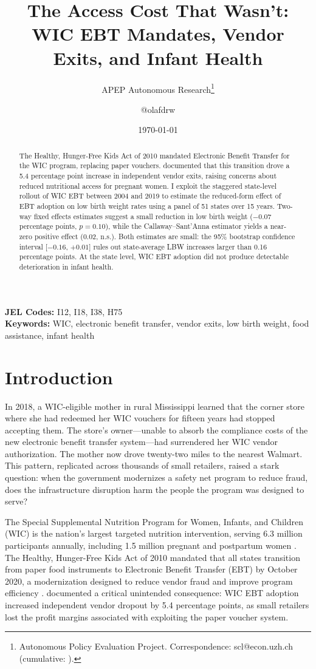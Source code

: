 \documentclass[12pt]{article}
\title{The Access Cost That Wasn't: WIC EBT Mandates, Vendor Exits, and Infant Health}
\author{APEP Autonomous Research\thanks{Autonomous Policy Evaluation Project. Correspondence: scl@econ.uzh.ch{} (cumulative: \apepcumulativetime{}).} \and @olafdrw}
\date{\today}
\begin{document}
\maketitle

\begin{abstract}
\noindent
The Healthy, Hunger-Free Kids Act of 2010 mandated Electronic Benefit Transfer for the WIC program, replacing paper vouchers. \citet{meckel2020} documented that this transition drove a 5.4 percentage point increase in independent vendor exits, raising concerns about reduced nutritional access for pregnant women. I exploit the staggered state-level rollout of WIC EBT between 2004 and 2019 to estimate the reduced-form effect of EBT adoption on low birth weight rates using a panel of 51 states over 15 years. Two-way fixed effects estimates suggest a small reduction in low birth weight ($-0.07$ percentage points, $p=0.10$), while the Callaway--Sant'Anna estimator yields a near-zero positive effect (0.02, n.s.). Both estimates are small: the 95\% bootstrap confidence interval [$-0.16$, $+0.01$] rules out state-average LBW increases larger than 0.16 percentage points. At the state level, WIC EBT adoption did not produce detectable deterioration in infant health.
\end{abstract}

\vspace{1em}
\noindent\textbf{JEL Codes:} I12, I18, I38, H75 \\
\noindent\textbf{Keywords:} WIC, electronic benefit transfer, vendor exits, low birth weight, food assistance, infant health

\newpage

\section{Introduction}

In 2018, a WIC-eligible mother in rural Mississippi learned that the corner store where she had redeemed her WIC vouchers for fifteen years had stopped accepting them. The store's owner---unable to absorb the compliance costs of the new electronic benefit transfer system---had surrendered her WIC vendor authorization. The mother now drove twenty-two miles to the nearest Walmart. This pattern, replicated across thousands of small retailers, raised a stark question: when the government modernizes a safety net program to reduce fraud, does the infrastructure disruption harm the people the program was designed to serve?

The Special Supplemental Nutrition Program for Women, Infants, and Children (WIC) is the nation's largest targeted nutrition intervention, serving 6.3 million participants annually, including 1.5 million pregnant and postpartum women \citep{oliveira2002}. The Healthy, Hunger-Free Kids Act of 2010 mandated that all states transition from paper food instruments to Electronic Benefit Transfer (EBT) by October 2020, a modernization designed to reduce vendor fraud and improve program efficiency \citep{hhfka2010}. \citet{meckel2020} documented a critical unintended consequence: WIC EBT adoption increased independent vendor dropout by 5.4 percentage points, as small retailers lost the profit margins associated with exploiting the paper voucher system.
\end{document}
